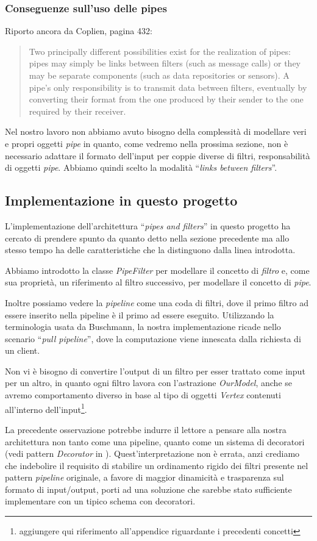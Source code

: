 \subsubsection{Conseguenze sull'uso delle pipes}
Riporto ancora da Coplien, pagina 432:
\begin{quotation}
  Two principally different possibilities exist for the realization of
  pipes: pipes may simply be links between filters (such as message
  calls) or they may be separate components (such as data repositories
  or sensors). A pipe's only responsibility is to transmit data
  between filters, eventually by converting their format from the one
  produced by their sender to the one required by their receiver.
\end{quotation}
Nel nostro lavoro non abbiamo avuto bisogno della complessit\`a di
modellare veri e propri oggetti \emph{pipe} in quanto, come vedremo
nella prossima sezione, non \`e necessario adattare il formato
dell'input per coppie diverse di filtri, responsabilit\`a di oggetti
\emph{pipe}. Abbiamo quindi scelto la modalit\`a ``\emph{links between
  filters}''.

\subsection{Implementazione in questo progetto}
L'implementazione dell'architettura ``\emph{pipes and filters}'' in
questo progetto ha cercato di prendere spunto da quanto detto nella
sezione precedente ma allo stesso tempo ha delle caratteristiche che
la distinguono dalla linea introdotta.

Abbiamo introdotto la classe \emph{PipeFilter} per modellare il
concetto di \emph{filtro} e, come sua propriet\`a, un riferimento al
filtro successivo, per modellare il concetto di \emph{pipe}.

Inoltre possiamo vedere la \emph{pipeline} come una coda di filtri,
dove il primo filtro ad essere inserito nella pipeline \`e il primo ad
essere eseguito. Utilizzando la terminologia usata da Buschmann, la
nostra implementazione ricade nello scenario ``\emph{pull pipeline}'',
dove la computazione viene innescata dalla richiesta di un client.

Non vi \`e bisogno di convertire l'output di un filtro per esser
trattato come input per un altro, in quanto ogni filtro lavora con
l'astrazione \emph{OurModel}, anche se avremo comportamento diverso in
base al tipo di oggetti \emph{Vertex} contenuti all'interno
dell'input\footnote{aggiungere qui riferimento all'appendice
  riguardante i precedenti concetti}.

La precedente osservazione potrebbe indurre il lettore a pensare alla
nostra architettura non tanto come una pipeline, quanto come un
sistema di decoratori (vedi pattern \emph{Decorator} in
\cite{SmalltalkCompanion98}). Quest'interpretazione non \`e errata,
anzi crediamo che indebolire il requisito di stabilire un ordinamento
rigido dei filtri presente nel pattern \emph{pipeline} originale, a
favore di maggior dinamicit\`a e trasparenza sul formato di
input/output, porti ad una soluzione che sarebbe stato sufficiente
implementare con un tipico schema con decoratori.
